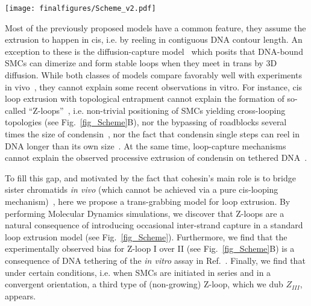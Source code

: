\documentclass[aps,prl,twocolumn,a4paper,10pt,notitlepage,footinbib,nobalancelastpage,superscriptaddress,showpacs,floatfix]{revtex4-1}%
\newcommand{\dmi}[1]{\textcolor{black}{#1}}%
\begin{document}
\begin{figure*}[!]
	\begin{center}
	\texttt{[image: finalfigures/Scheme\_v2.pdf]}
	\end{center}
	\vspace{-0.8 cm}
	\caption{	\dmi{A three-dimensional, or ``trans-grabbing'' model for loop extrusion. (A) We model LEFs as springs connecting two polymer beads; one of these beads is denoted as the ``anchor'' that does not move, while the other as the ``hinge'' that can jump to 3D proximal but non-contiguous polymer segments. By updating the position of the hinge via a mix of intra- and inter-strand moves, the system is driven to form Z-loops. (B) We identify 3 types of Z-loops: Z-loop I ($Z_I$) has both hinges pointing outwards thus yielding symmetric extrusion;  Z-loop II ($Z_{II}$) has both hinges pointing in the same direction and thus yields asymmetric extrusion; finally, Z-loop III ($Z_{III}$) has both hinges pointing inward and displays no net extrusion. Only $Z_I$ and $Z_{II}$ were observed in experiments~\cite{Kim2020}.}
	}
	\vspace{-0.4 cm}
	\label{fig_Scheme}
\end{figure*}

Most of the previously proposed models have a common feature, they assume the extrusion to happen in cis, i.e. by reeling in contiguous DNA contour length. An exception to these is the diffusion-capture model~\cite{Cheng2015} which posits that DNA-bound SMCs can dimerize and form stable loops when they meet in trans by 3D diffusion. While both classes of models compare favorably well with experiments in vivo~\cite{Gibcus2018,Gerguri2021}, they cannot explain some recent observations in vitro. For instance, cis loop extrusion with topological entrapment cannot explain the formation of so-called ``Z-loops''~\cite{Kim2020}, i.e. non-trivial positioning of SMCs yielding cross-looping topologies (see Fig.~\ref{fig_Scheme}B), nor the bypassing of roadblocks several times the size of condensin~\cite{Pradhan2021}, nor the fact that condensin single steps can reel in DNA longer than its own size~\cite{Ryu2021stepsize}. At the same time, loop-capture mechanisms~\cite{Cheng2015,Gerguri2021} cannot explain the observed processive extrusion of condensin on tethered DNA~\cite{Ganji2018}. 

To fill this gap, and motivated by the fact that cohesin's main role is to bridge sister chromatids \emph{in vivo} (which cannot be achieved via a pure cis-looping mechanism)~\cite{Nasmyth2009,Murayama2018,Piskadlo2017a}, here we propose a trans-grabbing model for loop extrusion. By performing Molecular Dynamics simulations, we discover that Z-loops are a natural consequence of introducing occasional inter-strand capture in a standard loop extrusion model (see Fig.~\ref{fig_Scheme}). Furthermore, we find that the experimentally observed bias for Z-loop I over II (see Fig.~\ref{fig_Scheme}B) is a consequence of DNA tethering of the \emph{in vitro} assay in Ref.~\cite{Kim2020}. Finally, we find that under certain conditions, i.e. when SMCs are initiated in series and in a convergent orientation, a third type of (non-growing) Z-loop, which we dub $Z_{III}$, appears. 
\end{document}
